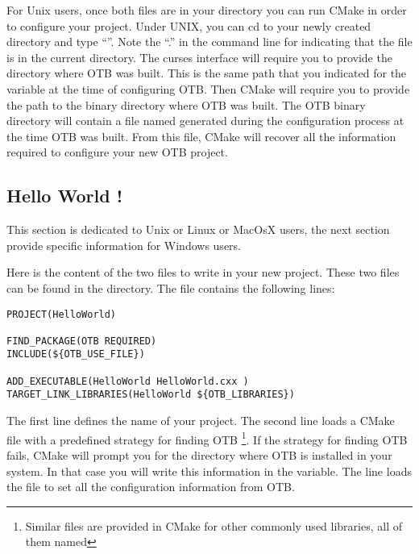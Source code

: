 For Unix users, once both files are in your directory you can run CMake in order to configure your project. Under UNIX, you can cd to your newly created directory and type ``''. Note the ``.'' in the command line for indicating that the  file is in the current directory. The curses interface will require you to provide the directory where OTB was built. This is the same path that you indicated for the  variable at the time of configuring OTB. Then CMake will require you to provide the path to the binary directory where OTB was built. The OTB binary directory will contain a file named  generated during the configuration process at the time OTB was built.  From this file, CMake will recover all the information required to configure your new OTB project.


\subsection{Hello World !}
\label{sec:HelloWorldOTB}

This section is dedicated to Unix or Linux or MacOsX users, the next section provide specific information for Windows users.


Here is the content of the two files to write in your new project. These two files can be found in the  directory. The  file contains the following lines:

\small
\begin{verbatim}
PROJECT(HelloWorld)

FIND_PACKAGE(OTB REQUIRED)
INCLUDE(${OTB_USE_FILE})

ADD_EXECUTABLE(HelloWorld HelloWorld.cxx )
TARGET_LINK_LIBRARIES(HelloWorld ${OTB_LIBRARIES})
\end{verbatim}

\normalsize

The first line defines the name of your project. The second line loads a CMake file with a predefined strategy for finding OTB \footnote{Similar files are provided in CMake for other commonly used libraries, all of them named }. If the strategy for finding OTB fails, CMake will prompt you for the directory where OTB is installed in your system. In that case you will write this information in the  variable. The line  loads the  file to set all the configuration information from OTB.

